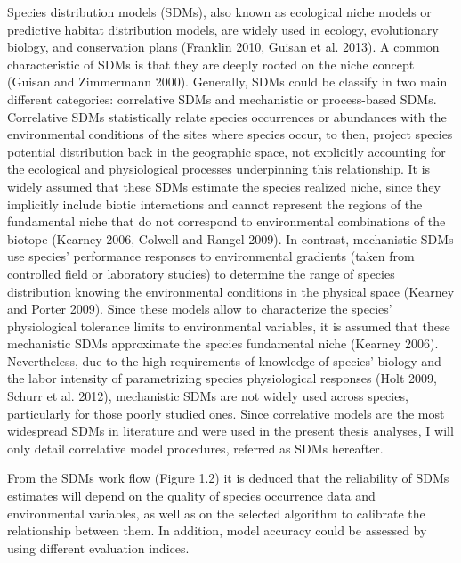 \documentclass[11pt,twoside]{reedthesis}
\begin{document}
Species distribution models (SDMs), also known as ecological niche
models or predictive habitat distribution models, are widely used in
ecology, evolutionary biology, and conservation plans (Franklin 2010,
Guisan et al. 2013). A common characteristic of SDMs is that they are
deeply rooted on the niche concept (Guisan and Zimmermann 2000).
Generally, SDMs could be classify in two main different categories:
correlative SDMs and mechanistic or process-based SDMs. Correlative SDMs
statistically relate species occurrences or abundances with the
environmental conditions of the sites where species occur, to then,
project species potential distribution back in the geographic space, not
explicitly accounting for the ecological and physiological processes
underpinning this relationship. It is widely assumed that these SDMs
estimate the species realized niche, since they implicitly include
biotic interactions and cannot represent the regions of the fundamental
niche that do not correspond to environmental combinations of the
biotope (Kearney 2006, Colwell and Rangel 2009). In contrast,
mechanistic SDMs use species' performance responses to environmental
gradients (taken from controlled field or laboratory studies) to
determine the range of species distribution knowing the environmental
conditions in the physical space (Kearney and Porter 2009). Since these
models allow to characterize the species' physiological tolerance limits
to environmental variables, it is assumed that these mechanistic SDMs
approximate the species fundamental niche (Kearney 2006). Nevertheless,
due to the high requirements of knowledge of species' biology and the
labor intensity of parametrizing species physiological responses (Holt
2009, Schurr et al. 2012), mechanistic SDMs are not widely used across
species, particularly for those poorly studied ones. Since correlative
models are the most widespread SDMs in literature and were used in the
present thesis analyses, I will only detail correlative model
procedures, referred as SDMs hereafter.\par
From the SDMs work flow (Figure 1.2) it is deduced that the reliability
of SDMs estimates will depend on the quality of species occurrence data
and environmental variables, as well as on the selected algorithm to
calibrate the relationship between them. In addition, model accuracy
could be assessed by using different evaluation indices.\par
\end{document}
